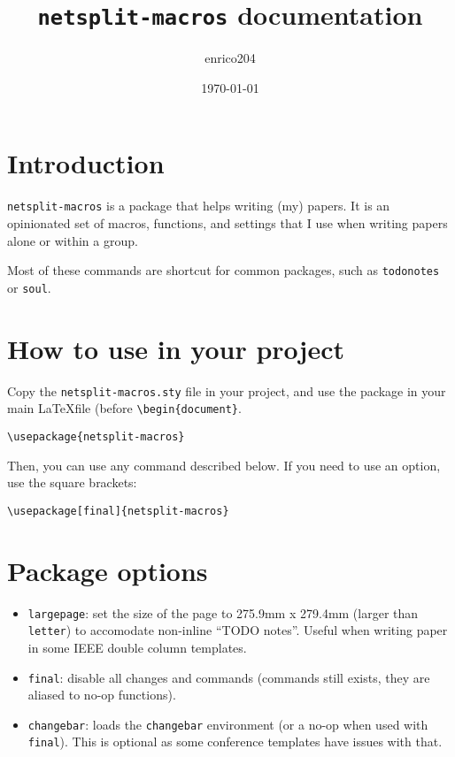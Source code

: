 \documentclass[a4paper]{article}
\title{\texttt{netsplit-macros} documentation}
\author{enrico204}
\date{\today}
\begin{document}
\maketitle

\tableofcontents

\section{Introduction}
\texttt{netsplit-macros} is a package that helps writing (my) papers. It is an opinionated set of macros, functions, and settings that I use when writing papers alone or within a group.

Most of these commands are shortcut for common packages, such as \texttt{todonotes} or \texttt{soul}.

\section{How to use in your project}

Copy the \texttt{netsplit-macros.sty} file in your project, and use the package in your main \LaTeX file (before \texttt{\textbackslash begin\{document\}}.

\begin{verbatim}
\usepackage{netsplit-macros}
\end{verbatim}

Then, you can use any command described below. If you need to use an option, use the square brackets:

\begin{verbatim}
\usepackage[final]{netsplit-macros}
\end{verbatim}

\section{Package options}

\begin{itemize}
    \item \texttt{largepage}: set the size of the page to 275.9mm x 279.4mm (larger than \texttt{letter}) to accomodate non-inline ``TODO notes''. Useful when writing paper in some IEEE double column templates.
    \item \texttt{final}: disable all changes and commands (commands still exists, they are aliased to no-op functions).
    \item \texttt{changebar}: loads the \texttt{changebar} environment (or a no-op when used with \texttt{final}). This is optional as some conference templates have issues with that.
\end{itemize}
\end{document}
